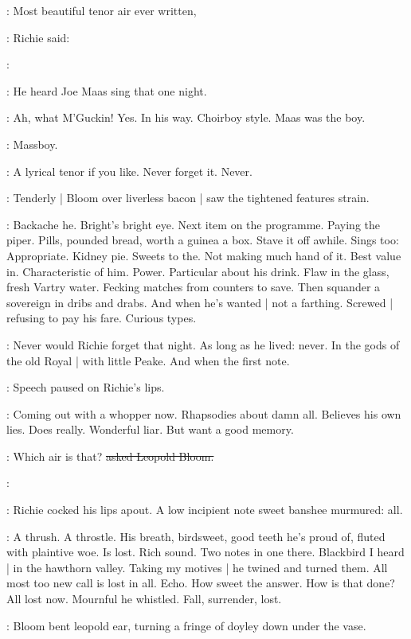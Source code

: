 \goulding:
Most beautiful tenor air ever written,

:
Richie said:

\goulding:

:
He heard Joe Maas sing that one night.

\goulding:
Ah,
what M'Guckin!
Yes.
In his way.
Choirboy style.
Maas was the boy.

:
Massboy.

\goulding:
A lyrical tenor if you like.
Never forget it.
Never.

:
Tenderly |
Bloom over liverless bacon |
saw the tightened features strain.

\BloomInt:
Backache he.
Bright's bright eye.
Next item on the programme.
Paying the piper.
Pills,
pounded bread,
worth a guinea a box.
Stave it off awhile.
Sings too:
Appropriate.
Kidney pie.
Sweets to the.
Not making much hand of it.
Best value in.
Characteristic of him.
Power.
Particular about his drink.
Flaw in the glass,
fresh Vartry water.
Fecking matches from counters to save.
Then squander a sovereign
in dribs and drabs.
And when he's wanted |
not a farthing.
Screwed |
refusing to pay his fare.
Curious types.

:
Never would Richie forget that night.
As long as he lived:
never.
In the gods of the old Royal |
with little Peake.
And when the first note.

:
Speech paused on Richie's lips.

\BloomInt:
Coming out with a whopper now.
Rhapsodies about damn all.
Believes his own lies.
Does really.
Wonderful liar.
But want a good memory.

\Bloom:
Which air is that?
\sout{asked Leopold Bloom.}

\goulding:

:
Richie cocked his lips apout.
A low incipient note sweet banshee murmured:
all.

\BloomInt:
A thrush.
A throstle.
His breath,
birdsweet,
good teeth he's proud of,
fluted with plaintive woe.
Is lost.
Rich sound.
Two notes in one there.
Blackbird I heard |
in the hawthorn valley.
Taking my motives |
he twined and turned them.
All most too new call is lost in all.
Echo.
How sweet the answer.
How is that done?
All lost now.
Mournful he whistled.
Fall,
surrender,
lost.

:
Bloom bent leopold ear,
turning a fringe of doyley down under the vase.

